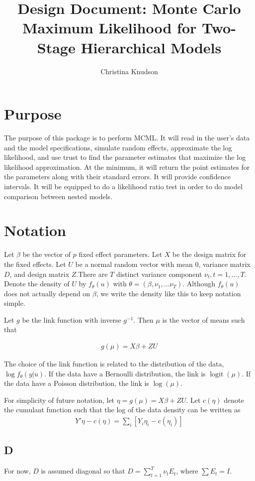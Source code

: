 \documentclass{article}
\title{Design Document: Monte Carlo Maximum Likelihood for Two-Stage Hierarchical Models}
\author{Christina Knudson}
\DeclareMathOperator{\logit}{logit}
\begin{document}
\maketitle{}
\section{Purpose}
The purpose of this package is to perform MCML. It will read in the user's data and the model specifications, simulate random effects, approximate the log likelihood, and use trust to find the parameter estimates that maximize the log likelihood approximation. At the minimum, it will return the point estimates for the parameters along with their standard errors. It will provide confidence intervals. It will be equipped to do a likelihood ratio test in order to do model comparison between nested models.


\section{Notation}
Let $\beta$ be the vector of $p$ fixed effect parameters. Let $X$ be the design matrix for the fixed effects.  Let $U$ be a normal random vector with mean 0, variance matrix $D$, and design matrix $Z$.There are $T$ distinct variance component  $\nu_t,t=1,...,T$.  Denote the density of $U$ by $f_\theta(u)$  with $\theta= (\beta,\nu_{1},...\nu_T)$. Although $f_\theta(u)$ does not actually depend on $\beta$, we write the density like this to keep notation simple.

Let $g$ be the link function with inverse $g^{-1}$. Then $\mu$ is the vector of means such that

\begin{align}
g(\mu) = X \beta + Z U
\end{align}


The choice of the link function is related to the distribution of the data, $\log f_\theta(y|u)$. If the data have a  Bernoulli distribution, the link is $\logit(\mu)$. If the data have a Poisson distribution, the link is $\log (\mu)$. 

For simplicity of future notation, let $\eta=g(\mu)=X \beta + Z U$. Let $c(\eta)$ denote the cumulant function such that the log of the data density can be written as
\begin{align}
Y' \eta - c(\eta) = \sum_i \left[ Y_i \eta_i - c(\eta_i)  \right]
\end{align}

\subsection{D }
For now,  $D$ is assumed  diagonal so that $D= \sum_{t=1}^T \nu_t E_t$, where $\sum E_t = I$.\\
\end{document}
